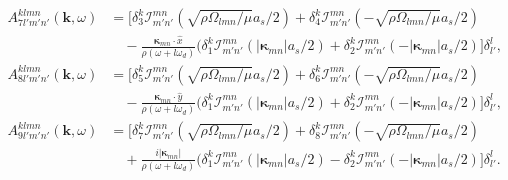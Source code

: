 \documentclass[aps,pre,amsmath,amssymb,floatfix,onecolumn,notitlepage,10pt]{revtex4-1}
\begin{document}
\begin{align}
A^{klmn}_{7l'm'n'}(\mathbf{k}, \omega) &= \Big[ \delta^k_{3} \mathcal{I}_{m'n'}^{mn} \left(\sqrt{\rho\Omega_{lmn}/\mu}a_s/2\right)  + \delta^k_{4} \mathcal{I}_{m'n'}^{mn} \left(-\sqrt{\rho\Omega_{lmn}/\mu}a_s/2\right) \label{lnoslip1}  \nonumber  \\
&\quad - \frac{\bm{\kappa}_{mn}\cdot \hat{x}}{\rho(\omega+l\omega_d)}(\delta^k_{1} \mathcal{I}_{m'n'}^{mn} \left(|\bm{\kappa}_{mn}|a_s/2\right) + \delta^k_{2} \mathcal{I}_{m'n'}^{mn} \left(-|\bm{\kappa}_{mn}|a_s/2\right) \Big]\delta^l_{l'},  \\
A^{klmn}_{8l'm'n'}(\mathbf{k}, \omega) &= \Big[ \delta^k_{5} \mathcal{I}_{m'n'}^{mn} \left(\sqrt{\rho\Omega_{lmn}/\mu}a_s/2\right)  + \delta^k_{6} \mathcal{I}_{m'n'}^{mn} \left(-\sqrt{\rho\Omega_{lmn}/\mu}a_s/2\right)  \nonumber \\
&\quad - \frac{\bm{\kappa}_{mn}\cdot \hat{y}}{\rho(\omega+l\omega_d)}(\delta^k_{1} \mathcal{I}_{m'n'}^{mn} \left(|\bm{\kappa}_{mn}|a_s/2\right) + \delta^k_{2} \mathcal{I}_{m'n'}^{mn} \left(-|\bm{\kappa}_{mn}|a_s/2\right) \Big]\delta^l_{l'},   \label{lnoslip2} \\
A^{klmn}_{9l'm'n'}(\mathbf{k}, \omega) &= \Big[ \delta^k_{7} \mathcal{I}_{m'n'}^{mn} \left(\sqrt{\rho\Omega_{lmn}/\mu}a_s/2\right)  + \delta^k_{8} \mathcal{I}_{m'n'}^{mn} \left(-\sqrt{\rho\Omega_{lmn}/\mu}a_s/2\right) \nonumber \\
&\quad + \frac{i|\bm{\kappa}_{mn}|}{\rho(\omega+l\omega_d)}(\delta^k_{1} \mathcal{I}_{m'n'}^{mn} \left(|\bm{\kappa}_{mn}|a_s/2\right) - \delta^k_{2} \mathcal{I}_{m'n'}^{mn} \left(-|\bm{\kappa}_{mn}|a_s/2\right) \Big]\delta^l_{l'}. \label{lnoslip3}
\end{align}
\end{document}

